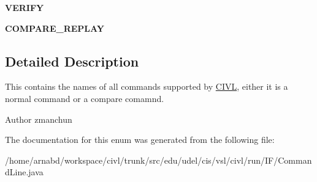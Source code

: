 \begin{DoxyCompactItemize}
\item 
\hypertarget{enumedu_1_1udel_1_1cis_1_1vsl_1_1civl_1_1run_1_1IF_1_1CommandLine_1_1CommandName_af6c92dfc08f9db87d7f922ac169f916e}{}{\bfseries V\+E\+R\+I\+F\+Y}\label{enumedu_1_1udel_1_1cis_1_1vsl_1_1civl_1_1run_1_1IF_1_1CommandLine_1_1CommandName_af6c92dfc08f9db87d7f922ac169f916e}

\item 
\hypertarget{enumedu_1_1udel_1_1cis_1_1vsl_1_1civl_1_1run_1_1IF_1_1CommandLine_1_1CommandName_a7494958b25ea221820cdcf3736666e7a}{}{\bfseries C\+O\+M\+P\+A\+R\+E\+\_\+\+R\+E\+P\+L\+A\+Y}\label{enumedu_1_1udel_1_1cis_1_1vsl_1_1civl_1_1run_1_1IF_1_1CommandLine_1_1CommandName_a7494958b25ea221820cdcf3736666e7a}

\end{DoxyCompactItemize}


\subsection{Detailed Description}
This contains the names of all commands supported by \hyperlink{classedu_1_1udel_1_1cis_1_1vsl_1_1civl_1_1CIVL}{C\+I\+V\+L}, either it is a normal command or a compare comamnd. 

\begin{DoxyAuthor}{Author}
zmanchun 
\end{DoxyAuthor}


The documentation for this enum was generated from the following file\+:\begin{DoxyCompactItemize}
\item 
/home/arnabd/workspace/civl/trunk/src/edu/udel/cis/vsl/civl/run/\+I\+F/Command\+Line.\+java\end{DoxyCompactItemize}
